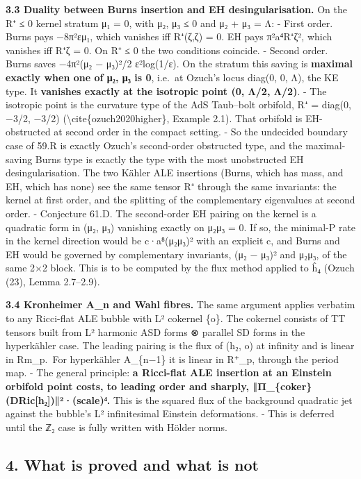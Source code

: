 \documentclass[
  10pt,
]{report}
\begin{document}
\textbf{3.3 Duality between Burns insertion and EH desingularisation.}
On the R⁺ ≤ 0 kernel stratum μ₁ = 0, with μ₂, μ₃ ≤ 0 and μ₂ + μ₃ = Λ: -
First order. Burns pays −8π²εμ₁, which vanishes iff R⁺(ζ,ζ) = 0. EH pays
π²a⁴\textbar R⁺ζ\textbar², which vanishes iff R⁺ζ = 0. On R⁺ ≤ 0 the two
conditions coincide. - Second order. Burns saves −4π²(μ₂ − μ₃)²/2
ε²log(1/ε). On the stratum this saving is \textbf{maximal exactly when
one of μ₂, μ₃ is 0}, i.e.~at Ozuch's locus diag(0, 0, Λ), the KE type.
It \textbf{vanishes exactly at the isotropic point (0, Λ/2, Λ/2)}. - The
isotropic point is the curvature type of the AdS Taub--bolt orbifold, R⁺
= diag(0, −3/2, −3/2) (\textbackslash cite\{ozuch2020higher\}, Example
2.1). That orbifold is EH-obstructed at second order in the compact
setting. - So the undecided boundary case of 59.R is exactly Ozuch's
second-order obstructed type, and the maximal-saving Burns type is
exactly the type with the most unobstructed EH desingularisation. The
two Kähler ALE insertions (Burns, which has mass, and EH, which has
none) see the same tensor R⁺ through the same invariants: the kernel at
first order, and the splitting of the complementary eigenvalues at
second order. - Conjecture 61.D. The second-order EH pairing on the
kernel is a quadratic form in (μ₂, μ₃) vanishing exactly on μ₂μ₃ = 0. If
so, the minimal-P rate in the kernel direction would be c·a⁸(μ₂μ₃)² with
an explicit c, and Burns and EH would be governed by complementary
invariants, (μ₂ − μ₃)² and μ₂μ₃, of the same 2×2 block. This is to be
computed by the flux method applied to ĥ₄ (Ozuch (23), Lemma 2.7--2.9).

\textbf{3.4 Kronheimer A\_n and Wahl fibres.} The same argument applies
verbatim to any Ricci-flat ALE bubble with L² cokernel \{o\}. The
cokernel consists of TT tensors built from L² harmonic ASD forms ⊗
parallel SD forms in the hyperkähler case. The leading pairing is the
flux of (h₂, o) at infinity and is linear in Rm\_p.~For hyperkähler
A\_\{n−1\} it is linear in R⁺\_p, through the period map. - The general
principle: \textbf{a Ricci-flat ALE insertion at an Einstein orbifold
point costs, to leading order and sharply,
‖Π\_\{coker\}(DRic{[}h₂{]})‖²·(scale)⁴.} This is the squared flux of the
background quadratic jet against the bubble's L² infinitesimal Einstein
deformations. - This is deferred until the ℤ₂ case is fully written with
Hölder norms.

\hypertarget{what-is-proved-and-what-is-not}{%
\subsection{4. What is proved and what is
not}\label{what-is-proved-and-what-is-not}}
\end{document}
